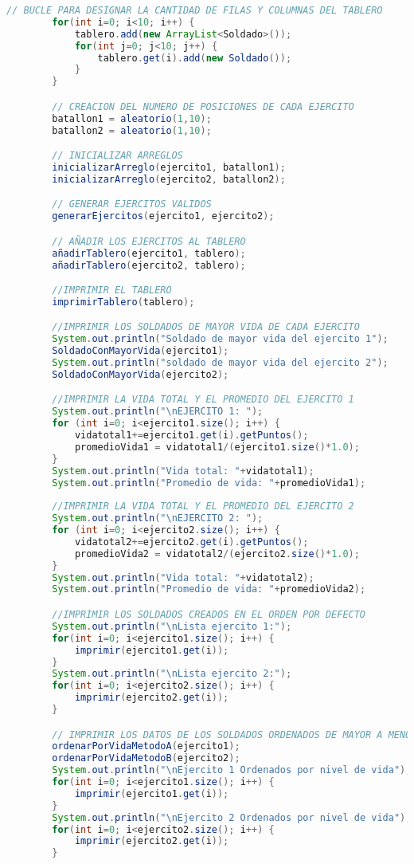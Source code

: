\documentclass{article}
\begin{document}
\begin{itemize}
\begin{itemize}
\begin{lstlisting}[language=java]
		// BUCLE PARA DESIGNAR LA CANTIDAD DE FILAS Y COLUMNAS DEL TABLERO
		for(int i=0; i<10; i++) {
			tablero.add(new ArrayList<Soldado>());
			for(int j=0; j<10; j++) {
				tablero.get(i).add(new Soldado());
			}
		}

		// CREACION DEL NUMERO DE POSICIONES DE CADA EJERCITO
		batallon1 = aleatorio(1,10);
		batallon2 = aleatorio(1,10);

		// INICIALIZAR ARREGLOS
		inicializarArreglo(ejercito1, batallon1);
		inicializarArreglo(ejercito2, batallon2);

		// GENERAR EJERCITOS VALIDOS
		generarEjercitos(ejercito1, ejercito2);

		// AÑADIR LOS EJERCITOS AL TABLERO
		añadirTablero(ejercito1, tablero);
		añadirTablero(ejercito2, tablero);

		//IMPRIMIR EL TABLERO
		imprimirTablero(tablero);

		//IMPRIMIR LOS SOLDADOS DE MAYOR VIDA DE CADA EJERCITO
		System.out.println("Soldado de mayor vida del ejercito 1");
		SoldadoConMayorVida(ejercito1);
		System.out.println("soldado de mayor vida del ejercito 2");
		SoldadoConMayorVida(ejercito2);

		//IMPRIMIR LA VIDA TOTAL Y EL PROMEDIO DEL EJERCITO 1
		System.out.println("\nEJERCITO 1: ");
		for (int i=0; i<ejercito1.size(); i++) {
			vidatotal1+=ejercito1.get(i).getPuntos();
			promedioVida1 = vidatotal1/(ejercito1.size()*1.0);
		}
		System.out.println("Vida total: "+vidatotal1);
		System.out.println("Promedio de vida: "+promedioVida1);
		
		//IMPRIMIR LA VIDA TOTAL Y EL PROMEDIO DEL EJERCITO 2
		System.out.println("\nEJERCITO 2: ");
		for (int i=0; i<ejercito2.size(); i++) {
			vidatotal2+=ejercito2.get(i).getPuntos();
			promedioVida2 = vidatotal2/(ejercito2.size()*1.0);
		}
		System.out.println("Vida total: "+vidatotal2);
		System.out.println("Promedio de vida: "+promedioVida2);

		//IMPRIMIR LOS SOLDADOS CREADOS EN EL ORDEN POR DEFECTO
		System.out.println("\nLista ejercito 1:");
		for(int i=0; i<ejercito1.size(); i++) {
			imprimir(ejercito1.get(i));
		}
		System.out.println("\nLista ejercito 2:");
		for(int i=0; i<ejercito2.size(); i++) {
			imprimir(ejercito2.get(i));
		}

		// IMPRIMIR LOS DATOS DE LOS SOLDADOS ORDENADOS DE MAYOR A MENOR DEPENDIENDO DE SU NIVEL DE VIDA USANDO DOS TIPOS DE ALGORITMO
		ordenarPorVidaMetodoA(ejercito1);
		ordenarPorVidaMetodoB(ejercito2);
		System.out.println("\nEjercito 1 Ordenados por nivel de vida");
		for(int i=0; i<ejercito1.size(); i++) {
			imprimir(ejercito1.get(i));
		}
		System.out.println("\nEjercito 2 Ordenados por nivel de vida");
		for(int i=0; i<ejercito2.size(); i++) {
			imprimir(ejercito2.get(i));
		}
		

\end{lstlisting}
\end{itemize}
\end{itemize}
\end{document}
